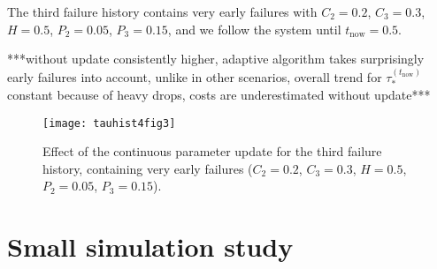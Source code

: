 \documentclass[authoryear]{elsarticle}
\def\tnow{t_\text{now}}
\newcommand{\tausnow}{\tau_*^{(\tnow)}}
\newcommand{\tthresh}{\tau_{\text{thresh}}}
\begin{document}
%

The third failure history contains very early failures
with $C_2 = 0.2$, $C_3 = 0.3$, $H = 0.5$, $P_2 = 0.05$, $P_3 = 0.15$,
and we follow the system until $\tnow = 0.5$.

***without update consistently higher, adaptive algorithm takes surprisingly early failures into account,
unlike in other scenarios, overall trend for $\tausnow$ constant because of heavy drops,
costs are underestimated without update***

\begin{figure}
\texttt{[image: tauhist4fig3]}
\caption{Effect of the continuous parameter update for the third failure history,
containing very early failures ($C_2 = 0.2$, $C_3 = 0.3$, $H = 0.5$, $P_2 = 0.05$, $P_3 = 0.15$).}
\label{fig:tauhist4fig3}
\end{figure}


\section{Small simulation study}
\label{sec:sim}
\end{document}
